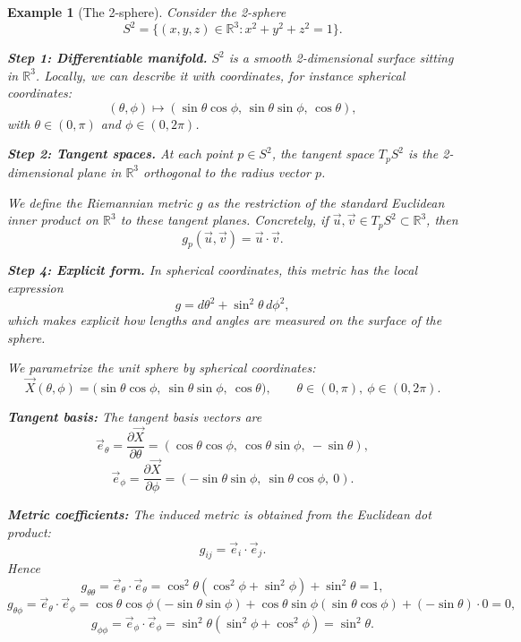 \documentclass{article}
\newtheorem{example}{Example}
\begin{document}
\begin{example}[The 2-sphere]
Consider the 2-sphere
\[
S^2 = \{ (x,y,z) \in \mathbb{R}^3 : x^2 + y^2 + z^2 = 1 \}.
\]

\textbf{Step 1: Differentiable manifold.}  
\(S^2\) is a smooth 2-dimensional surface sitting in \(\mathbb{R}^3\).   Locally, we can describe it with coordinates, for instance spherical coordinates:
\[
(\theta,\phi) \mapsto (\sin\theta \cos\phi, \, \sin\theta \sin\phi, \, \cos\theta),
\]
with \(\theta \in (0,\pi)\) and \(\phi \in (0,2\pi)\).

\textbf{Step 2: Tangent spaces.}  
At each point \(p \in S^2\), the tangent space \(T_p S^2\) is the 2-dimensional plane in \(\mathbb{R}^3\) orthogonal to the radius vector \(p\).  

We define the Riemannian metric \(g\) as the restriction of the standard Euclidean inner product on \(\mathbb{R}^3\) to these tangent planes. Concretely, if 
\(\vec{u}, \vec{v} \in T_p S^2 \subset \mathbb{R}^3\), then
\[
g_p(\vec{u}, \vec{v}) = \vec{u} \cdot \vec{v}.
\]

\textbf{Step 4: Explicit form.}  
In spherical coordinates, this metric has the local expression
\[
g = d\theta^2 + \sin^2 \theta \, d\phi^2,
\]
which makes explicit how lengths and angles are measured on the surface of the sphere.


We parametrize the unit sphere by spherical coordinates:
\[
\vec{X}(\theta,\phi) = 
\bigl(\sin\theta \cos\phi,\ \sin\theta \sin\phi,\ \cos\theta\bigr),
\qquad \theta \in (0,\pi),\ \phi \in (0,2\pi).
\]

\textbf{Tangent basis:}  
The tangent basis vectors are
\[
\vec{e}_\theta = \frac{\partial \vec{X}}{\partial \theta} 
= (\cos\theta \cos\phi,\ \cos\theta \sin\phi,\ -\sin\theta),
\]
\[
\vec{e}_\phi = \frac{\partial \vec{X}}{\partial \phi} 
= (-\sin\theta \sin\phi,\ \sin\theta \cos\phi,\ 0).
\]

\textbf{Metric coefficients:}  
The induced metric is obtained from the Euclidean dot product:
\[
g_{ij} = \vec{e}_i \cdot \vec{e}_j.
\]
Hence
\[
g_{\theta\theta} = \vec{e}_\theta \cdot \vec{e}_\theta 
= \cos^2\theta(\cos^2\phi+\sin^2\phi) + \sin^2\theta = 1,
\]
\[
g_{\theta\phi} = \vec{e}_\theta \cdot \vec{e}_\phi 
= \cos\theta\cos\phi(-\sin\theta\sin\phi) 
+ \cos\theta\sin\phi(\sin\theta\cos\phi) + (-\sin\theta)\cdot 0 = 0,
\]
\[
g_{\phi\phi} = \vec{e}_\phi \cdot \vec{e}_\phi 
= \sin^2\theta(\sin^2\phi+\cos^2\phi) = \sin^2\theta.
\]


\end{example}
\end{document}
